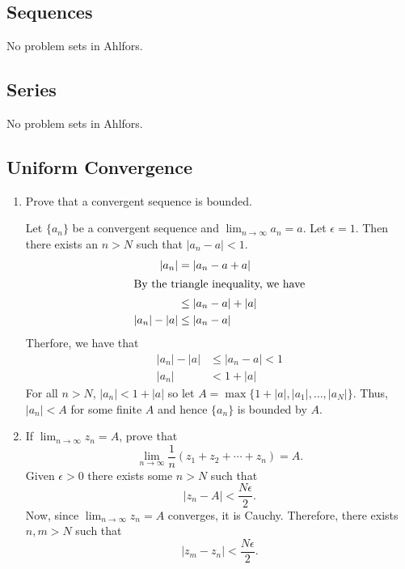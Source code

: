 \subsection{Sequences}

No problem sets in Ahlfors.

\subsection{Series}

No problem sets in Ahlfors.

\subsection{Uniform Convergence}

\begin{enumerate}
\item
  Prove that a convergent sequence is bounded.
  \par\smallskip
  Let \(\{a_n\}\) be a convergent sequence and \(\lim_{n\to\infty}a_n = a\).
  Let \(\epsilon = 1\).
  Then there exists an \(n > N\) such that \(\lvert a_n - a\rvert < 1\).
  \begin{align*}
    \lvert a_n\rvert & = \lvert a_n - a + a\rvert\\
    \intertext{By the triangle inequality, we have}
                     & \leq \lvert a_n - a\rvert + \lvert a\rvert\\
    \lvert a_n\rvert - \lvert a\rvert & \leq \lvert a_n - a\rvert
  \end{align*}
  Therfore, we have that
  \begin{align*}
    \lvert a_n\rvert - \lvert a\rvert & \leq\lvert a_n - a\rvert < 1\\
    \lvert a_n\rvert & < 1 + \lvert a\rvert
  \end{align*}
  For all \(n > N\), \(\lvert a_n\rvert < 1 + \lvert a\rvert\) so let
  \(A = \max\bigl\{1 + \lvert a\rvert,\lvert a_1\rvert,\ldots,
  \lvert a_N\rvert\bigr\}\).
  Thus, \(\lvert a_n\rvert < A\) for some finite \(A\) and hence \(\{a_n\}\) is
  bounded by \(A\).
\item
  If \(\lim_{n\to\infty}z_n = A\), prove that
  \[
  \lim_{n\to\infty}\frac{1}{n}(z_1 + z_2 + \cdots + z_n) = A.
  \]
  Given \(\epsilon > 0\) there exists some \(n > N\) such that
  \[
  \lvert z_n - A\rvert < \frac{N\epsilon}{2}.
  \]
  Now, since \(\lim_{n\to\infty}z_n = A\) converges, it is Cauchy.
  Therefore, there exists \(n,m > N\) such that
  \[
  \lvert z_m - z_n\rvert < \frac{N\epsilon}{2}.
\]
\end{enumerate}
